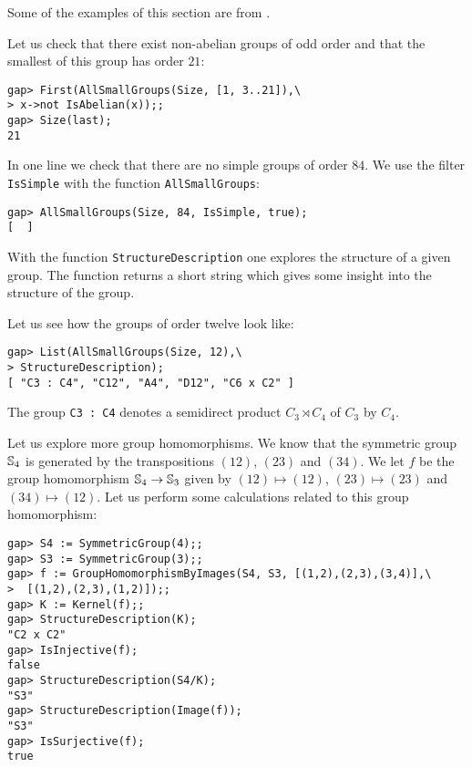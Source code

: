 Some of the examples of this section are from \cite{MR605275}. 

\begin{example}
	Let us check that there exist non-abelian groups of odd order and that the
	smallest of this group has order $21$:
\begin{lstlisting}
gap> First(AllSmallGroups(Size, [1, 3..21]),\
> x->not IsAbelian(x));;
gap> Size(last);
21
\end{lstlisting}
\end{example}

\begin{example}
In one line we check that there are no simple groups of order $84$. We use 
the filter \lstinline{IsSimple} with the function 
\lstinline{AllSmallGroups}:
\begin{lstlisting}
gap> AllSmallGroups(Size, 84, IsSimple, true);
[  ]
\end{lstlisting}
\end{example}

With the function \lstinline{StructureDescription} one explores the structure
of a given group. The function returns a short string which gives some insight
into the structure of the group.  

\begin{example}
Let us see how the groups of order twelve look like:
\begin{lstlisting}
gap> List(AllSmallGroups(Size, 12),\
> StructureDescription);
[ "C3 : C4", "C12", "A4", "D12", "C6 x C2" ]
\end{lstlisting}
The group \lstinline{C3 : C4} denotes a semidirect product 
$C_3\rtimes C_4$ of $C_3$ by $C_4$.  
\end{example}

\begin{example}
Let us explore more group homomorphisms. We know that the symmetric group $\mathbb{S}_4$
is generated by the transpositions $(12)$, $(23)$ and $(34)$. We let $f$ be the
group homomorphism $\mathbb{S}_4\to\mathbb{S}_3$ given by $(12)\mapsto (12)$, $(23)\mapsto
(23)$ and $(34)\mapsto(12)$. 
Let us perform some calculations related to this
group homomorphism:
\begin{lstlisting}
gap> S4 := SymmetricGroup(4);;
gap> S3 := SymmetricGroup(3);;
gap> f := GroupHomomorphismByImages(S4, S3, [(1,2),(2,3),(3,4)],\
>  [(1,2),(2,3),(1,2)]);;
gap> K := Kernel(f);;
gap> StructureDescription(K);
"C2 x C2"
gap> IsInjective(f);
false
gap> StructureDescription(S4/K);
"S3"
gap> StructureDescription(Image(f));
"S3"
gap> IsSurjective(f);
true
\end{lstlisting}
\end{example}

